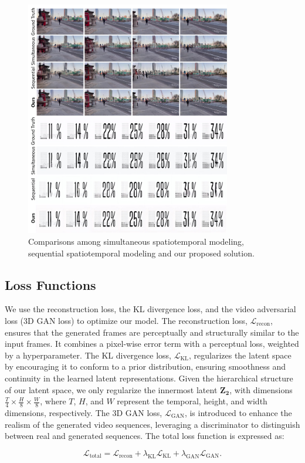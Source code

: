 \begin{figure}[t]
\centering
\includegraphics[width=0.8\textwidth]{images/aba-arch.pdf}
\caption{Comparisons among simultaneous spatiotemporal modeling, sequential spatiotemporal modeling and our proposed solution. 
}
\label{fig:modeling}
\vspace{-3mm}
\end{figure}



\subsection{Loss Functions}
We use the reconstruction loss, the KL divergence loss, and the video adversarial loss (3D GAN loss) to optimize our model. 
The reconstruction loss, $\mathcal{L}_{\text{recon}}$, ensures that the generated frames are perceptually and structurally similar to the input frames. It combines a pixel-wise error term with a perceptual loss, weighted by a hyperparameter.
The KL divergence loss, $\mathcal{L}_{\text{KL}}$, regularizes the latent space by encouraging it to conform to a prior distribution, ensuring smoothness and continuity in the learned latent representations. Given the hierarchical structure of our latent space, we only regularize the innermost latent $\mathbf{Z_2}$, with dimensions $\frac{T}{4} \times \frac{H}{8} \times \frac{W}{8}$, where $T$, $H$, and $W$ represent the temporal, height, and width dimensions, respectively. The 3D GAN loss, $\mathcal{L}_{\text{GAN}}$, is introduced to enhance the realism of the generated video sequences, leveraging a discriminator to distinguish between real and generated sequences.
The total loss function is expressed as:

\begin{equation}
    \mathcal{L}_{\text{total}} = \mathcal{L}_{\text{recon}} + \lambda_{\text{KL}} \mathcal{L}_{\text{KL}} + \lambda_{\text{GAN}} \mathcal{L}_{\text{GAN}}.
\end{equation}

